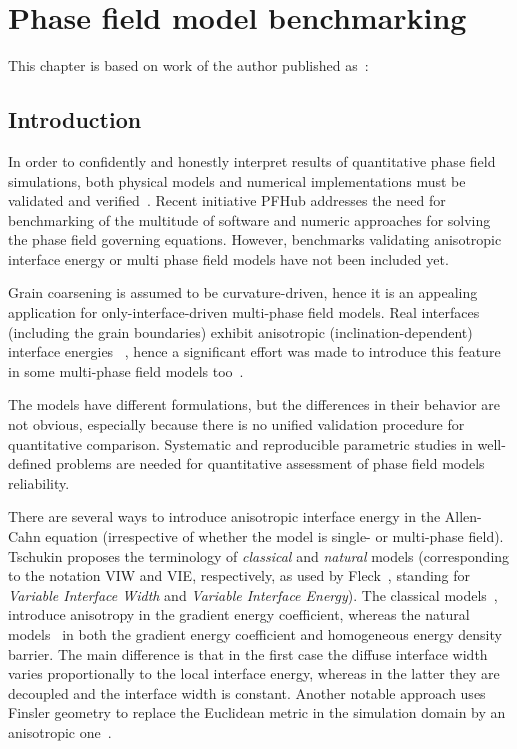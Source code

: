 \chapter{Phase field model benchmarking}
\label{ch_paper1}
This chapter is based on work of the author published as~\cite{Minar2022}: 

\section{Introduction}
\label{sec_P1_Intro}
In order to confidently and honestly interpret results of quantitative phase field simulations, both physical models and numerical implementations must be validated and verified~\cite{Jokisaari2017}. Recent initiative PFHub addresses the need for benchmarking of the multitude of software and numeric approaches for solving the phase field governing equations. However, benchmarks validating anisotropic interface energy or multi phase field models have not been included yet.

Grain coarsening is assumed to be curvature-driven, hence it is an appealing application for only-interface-driven multi-phase field models. Real interfaces (including the grain boundaries) exhibit anisotropic (inclination-dependent) interface energies ~\cite{Olmsted2009,Bulatov2014}, hence a significant effort was made to introduce this feature in some multi-phase field models too~\cite{Garcke1999,Toth2015,Salama2020,Kazaryan2000,Wendler2011}.

The models have different formulations, but the differences in their behavior are not obvious, especially because there is no unified validation procedure for quantitative comparison. Systematic and reproducible parametric studies in well-defined problems are needed for quantitative assessment of phase field models reliability. 

There are several ways to introduce anisotropic interface energy in the Allen-Cahn equation (irrespective of whether the model is single- or multi-phase field). Tschukin \cite{Tschukin2017} proposes the terminology of \textit{classical} and \textit{natural} models (corresponding to the notation VIW and VIE, respectively, as used by Fleck~\cite{Fleck2011}, standing for \textit{Variable Interface Width} and \textit{Variable Interface Energy}). The classical models~\cite{Kobayashi1993,McFadden1993,Taylor1998,Eggleston2001,Wheeler2006}, introduce anisotropy in the gradient energy coefficient, whereas the natural models~\cite{Ma2006,Torabi2009,Fleck2011,Moelans2008} in both the gradient energy coefficient and homogeneous energy density barrier. The main difference is that in the first case the diffuse interface width varies proportionally to the local interface energy, whereas in the latter they are decoupled and the interface width is constant. Another notable approach uses Finsler geometry to replace the Euclidean metric in the simulation domain by an anisotropic one~\cite{Bellettini1996,Benes2003}.

